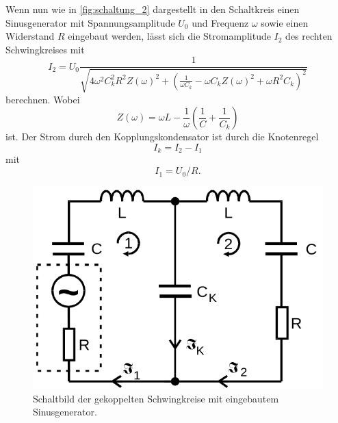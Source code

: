 Wenn nun wie in \autoref{fig:schaltung_2} dargestellt in den Schaltkreis einen Sinusgenerator mit Spannungsamplitude $U_0$ und Frequenz $\omega$ sowie einen Widerstand $R$ eingebaut werden, lässt sich die Stromamplitude $I_2$ des rechten Schwingkreises mit 
\begin{equation}
    \label{eq:stromamplitude}
    I_2 = U_0 \frac{1}{\sqrt{4 \omega^2 C_k^2 R^2 Z(\omega)^2 + \left( \frac{1}{\omega C_k} - \omega C_k Z(\omega)^2 + \omega R^2 C_k \right)^2 }}
\end{equation}
berechnen. Wobei 
\begin{equation}
    Z(\omega) = \omega L - \frac{1}{\omega} \left( \frac{1}{C} + \frac{1}{C_k} \right)
\end{equation}
ist. \cite{V355}
Der Strom durch den Kopplungskondensator ist durch die Knotenregel
\begin{equation}
    I_k = I_2 - I_1
\end{equation}
mit 
\begin{equation}
    I_1 = U_0 / R.
\end{equation}
\begin{figure}
    \centering
    \includegraphics[width=\textwidth/3]{images/schaltung_2.png}
    \caption{Schaltbild der gekoppelten Schwingkreise mit eingebautem Sinusgenerator. \cite{V355}}
    \label{fig:schaltung_2}
\end{figure}

